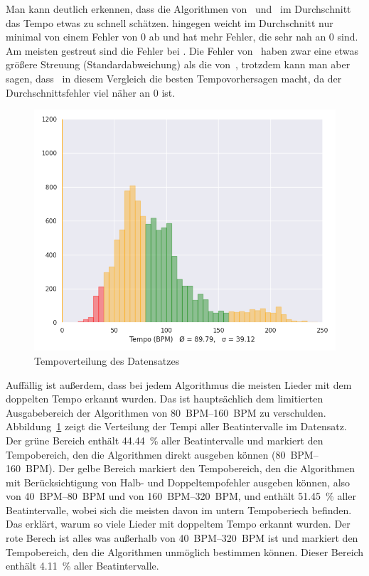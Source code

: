 {{		%
		Man kann deutlich erkennen,
			dass die Algorithmen von~\cite{2001_BeatThis} und~\cite{2011_PlRoSt} im Durchschnitt das Tempo etwas zu schnell schätzen.
		\cite{2009_DaPlSt} hingegen weicht im Durchschnitt nur minimal von einem Fehler von 0 ab und
			hat mehr Fehler, die sehr nah an 0 sind.
		Am meisten gestreut sind die Fehler bei \cite{2001_BeatThis}.
		Die Fehler von~\cite{2009_DaPlSt} haben zwar eine etwas grö{\ss}ere Streuung (Standardabweichung) als die von~\cite{2011_PlRoSt},
			trotzdem kann man aber sagen,
			dass~\cite{2009_DaPlSt} in diesem Vergleich die besten Tempovorhersagen macht,
			da der Durchschnittsfehler viel näher an 0 ist.

		\begin{figure}[h]
			\centering
			\includegraphics[scale=0.45]{resources/dataset_tempo_histogram.png}
			\caption{Tempoverteilung des Datensatzes}
			\label{fig:dataset_tempo}
		\end{figure}

		Auffällig ist au{\ss}erdem,
			dass bei jedem Algorithmus die meisten Lieder mit dem doppelten Tempo erkannt wurden.
		Das ist hauptsächlich dem limitierten Ausgabebereich der Algorithmen von \SIrange{80}{160}{\ac{BPM}} zu verschulden.
		Abbildung~\ref{fig:dataset_tempo} zeigt die Verteilung der Tempi aller Beatintervalle im Datensatz.
		Der grüne Bereich enthält \SI{44.44}{\percent} aller Beatintervalle
			und markiert den Tempobereich,
			den die Algorithmen direkt ausgeben können (\SIrange{80}{160}{\ac{BPM}}).
		Der gelbe Bereich markiert den Tempobereich,
			den die Algorithmen mit Berücksichtigung von Halb- und Doppeltempofehler ausgeben können,
			also von \SIrange{40}{80}{\ac{BPM}} und von \SIrange{160}{320}{\ac{BPM}},
			und enthält \SI{51.45}{\percent} aller Beatintervalle,
			wobei sich die meisten davon im untern Tempoberiech befinden.
		Das erklärt,
			warum so viele Lieder mit doppeltem Tempo erkannt wurden.
		Der rote Berech ist alles was au{\ss}erhalb von \SIrange{40}{320}{\ac{BPM}} ist
			und markiert den Tempobereich,
			den die Algorithmen unmöglich bestimmen können.
		Dieser Bereich enthält \SI{4.11}{\percent} aller Beatintervalle.
	}

}
